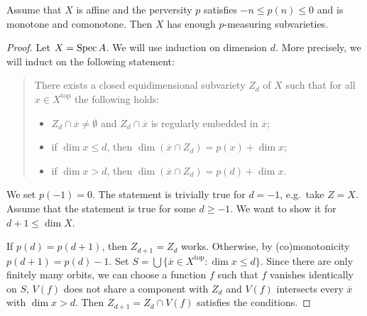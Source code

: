 \documentclass[english,biblatex-alpha]{short-notes}
\newcommand\dualize{\mathbb D}
\begin{document}
\begin{Thm}
    \label{thm:existance}%
    Assume that $X$ is affine and the perversity $p$ satisfies $-n \le p(n) \le 0$ and is monotone and comonotone.
    Then $X$ has enough $p$-measuring subvarieties.
\end{Thm}

\begin{proof}
    Let $X = \operatorname{Spec} A$.
    We will use induction on dimension $d$.
    More precisely, we will induct on the following statement:
    \begin{quote}
        There exists a closed equidimensional subvariety $Z_d$ of $X$ such that for all $x ∈ X^{\mathrm{top}}$ the following holds:
        \begin{itemize}
            \item $Z_d \cap \overline x \ne \emptyset$ and $Z_d \cap \overline x$ is regularly embedded in $\overline x$;
            \item if $\dim x \le d$, then $\dim(\overline x ∩ Z_d) = p(x) + \dim x$;
            \item if $\dim x > d$, then $\dim(\overline x ∩ Z_d) = p(d) + \dim x$.
        \end{itemize}
    \end{quote}
    We set $p(-1) = 0$.
    The statement is trivially true for $d = -1$, e.g.~take $Z = X$.
    Assume that the statement is true for some $d \ge -1$.
    We want to show it for $d+1 \le \dim X$.

    If $p(d) = p(d+1)$, then $Z_{d+1} = Z_{d}$ works.
    Otherwise, by (co)monotonicity $p(d+1) = p(d) - 1$.
    Set $S = \bigcup \{ \overline x ∈ X^{\mathrm{top}} : \dim x \le d\}$.
    Since there are only finitely many orbits, we can choose a function $f$  such that $f$ vanishes identically on $S$, $V(f)$ does not share a component with $Z_d$ and $V(f)$ intersects every $\overline x$ with $\dim x > d$.
    Then $Z_{d+1} = Z_d \cap V(f)$ satisfies the conditions.
\end{proof}


\printbibliography
\end{document}
